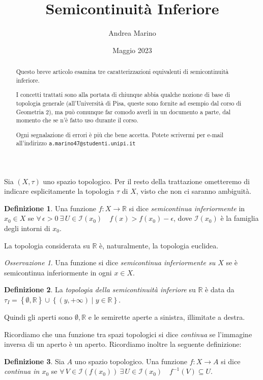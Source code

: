 \documentclass[a4paper, 11pt]{article}
\title{Semicontinuità Inferiore}
\author{Andrea Marino}
\date{Maggio 2023}
\newcommand{\R}{\mathbb{R}}
\newcommand{\I}[1]{\mathcal{I}(#1)}
\theoremstyle{plain} 	%
\theoremstyle{definition}
\newtheorem{definizione}{Definizione}
\theoremstyle{remark}
\newtheorem*{oss*}{Osservazione}
\begin{document}
    \maketitle
    
    \begin{abstract}
        Questo breve articolo esamina tre caratterizzazioni equivalenti di semicontinuità inferiore. 

        I concetti trattati sono alla portata di chiunque abbia qualche nozione di base di topologia generale (all'Università di Pisa, queste sono fornite ad esempio dal corso di Geometria 2), ma può comunque far comodo 
        averli in un documento a parte, dal momento che se n'è fatto uso durante il corso.
        \smallskip

        Ogni segnalazione di errori è più che bene accetta. Potete scrivermi per e-mail all'indirizzo 
		\texttt{a.marino47@studenti.unipi.it}
    \end{abstract}

    Sia $\left(X,\tau\right)$ uno spazio topologico. Per il resto della trattazione ometteremo di indicare esplicitamente la topologia $\tau$ di $X$, visto che non ci saranno ambiguità.
    \begin{definizione}
        Una funzione $f\colon X\to\R$ si dice \emph{semicontinua inferiormente} in $x_0\in X$ se $\forall\,\epsilon>0\ \exists\,U\in\I{x_0}\quad f(x)>f(x_0)-\epsilon$, dove $\I{x_0}$ è la famiglia degli intorni di $x_0$.
    \end{definizione}
    La topologia considerata su $\R$ è, naturalmente, la topologia euclidea.
    \begin{oss*}
        Una funzione si dice \emph{semicontinua inferiormente su $X$} se è semicontinua inferiormente in ogni $x\in X$.
    \end{oss*}
    \begin{definizione}\label{def:top_sci}
        La \emph{topologia della semicontinuità inferiore} su $\R$ è data da $\tau_I=\left\{\emptyset,\R\right\}\cup\left\{(y,+\infty)\mid y\in\R\right\}$.
    \end{definizione}
    Quindi gli aperti sono $\emptyset, \R$ e le semirette aperte a sinistra, illimitate a destra.

    Ricordiamo che una funzione tra spazi topologici si dice \emph{continua} se l'immagine inversa di un aperto è un aperto. Ricordiamo inoltre la seguente definizione:

    \begin{definizione}\label{def:cont_pt}
        Sia $A$ uno spazio topologico. Una funzione $f\colon X\to A$ si dice \emph{continua in $x_0$} se $\forall\,V\in\I{f(x_0)}\ \exists\,U\in\I{x_0}\quad f^{-1}\left(V\right)\subseteq U$.
    \end{definizione}
\end{document}
